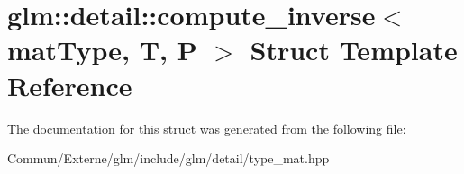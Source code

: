 \hypertarget{structglm_1_1detail_1_1compute__inverse}{}\section{glm\+:\+:detail\+:\+:compute\+\_\+inverse$<$ mat\+Type, T, P $>$ Struct Template Reference}
\label{structglm_1_1detail_1_1compute__inverse}


The documentation for this struct was generated from the following file\+:\begin{DoxyCompactItemize}
\item 
Commun/\+Externe/glm/include/glm/detail/type\+\_\+mat.\+hpp\end{DoxyCompactItemize}

